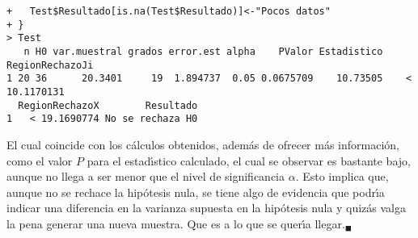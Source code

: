 \begin{solucion}
\begin{verbatim}
+   Test$Resultado[is.na(Test$Resultado)]<-"Pocos datos"
+ }
> Test
   n H0 var.muestral grados error.est alpha    PValor Estadistico RegionRechazoJi
1 20 36      20.3401     19  1.894737  0.05 0.0675709    10.73505    < 10.1170131
  RegionRechazoX        Resultado
1   < 19.1690774 No se rechaza H0
 \end{verbatim}
 El cual coincide con los c\'alculos obtenidos,
 adem\'as de ofrecer m\'as informaci\'on, como el valor $P$
 para el estad\'{\i}stico calculado, el cual se observar es bastante bajo,
 aunque no llega a ser menor que el nivel de significancia $\alpha$.
 Esto implica que, aunque no se rechace la hip\'otesis nula,
 se tiene algo de evidencia que podr\'{\i}a indicar una diferencia
 en la varianza supuesta en la hip\'otesis nula y quiz\'as valga la pena
 generar una nueva muestra.
 Que es a lo que se quer\'{\i}a llegar.${}_{\blacksquare}$
\end{solucion}
